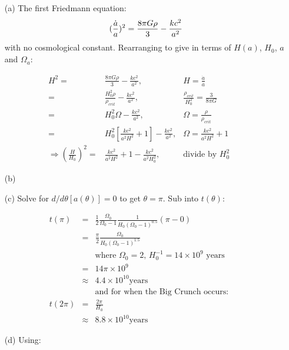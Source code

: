 \documentclass[10pt,a4paper]{article}
\begin{document}
\begin{itemize}
	\item[(a)] The first Friedmann equation:
	\begin{equation}
		(\frac{\dot a}{a})^{2} = \frac{8 \pi G \rho}{3} - \frac{kc^{2}}{a^{2}} \\
	\end{equation}
	with no cosmological constant. Rearranging to give in terms of $H(a)$, $H_{0}$, $a$ and $\Omega_{a}$:
\end{itemize}
\begin{eqnarray*}
	H^{2} =& \frac{8 \pi G \rho}{3} - \frac{kc^{2}}{a^{2}}, &H = \frac{\dot a}{a} \\
	  =& \frac{H_{0}^{2} \rho}{\rho_{crit}} - \frac{kc^{2}}{a^{2}}, &\frac{\rho_{crit}}{H_{0}^{2}} = \frac{3}{8 \pi G} \\
	  =& H_{0}^{2}\Omega - \frac{kc^{2}}{a^{2}}, &\Omega = \frac{\rho}{\rho_{crit}} \\
	  =& H_{0}^{2}[\frac{kc^{2}}{a^{2}H^{2}} + 1] - \frac{kc^{2}}{a^{2}}, & \Omega = \frac{kc^{2}}{a^{2}H^{2}} + 1 \\
	\Rightarrow (\frac{H}{H_{0}})^{2} =& \frac{kc^{2}}{a^{2}H^{2}} + 1 - \frac{kc^{2}}{a^{2}H_{0}^{2}}, &\mbox{divide by $H_{0}^{2}$}
\end{eqnarray*}
\begin{itemize}
	\item[(b)] 
	\item[(c)] Solve for $d/d\theta [a(\theta)] = 0$ to get $\theta = \pi$. Sub into $t(\theta)$:
\end{itemize}
\begin{eqnarray*}
	t(\pi) &=& \frac{1}{2}\frac{\Omega_{0}}{\Omega_{0} - 1} \frac{1}{H_{0}(\Omega_{0} - 1)^{0.5}} (\pi - 0) \\
	       &=& \frac{\pi}{2}\frac{\Omega_{0}}{H_{0}(\Omega_{0} - 1)^{1.5}} \\
		   &&\mbox{where $\Omega_{0} = 2$, $H_{0}^{-1} = 14 \times 10^{9}$ years} \\
		   &=& 14\pi \times 10^{9} \\
		   &\approx& 4.4 \times 10^{10} \mbox{years} \\
		   &&\mbox{and for when the Big Crunch occurs:} \\
	t(2\pi) &=& \frac{2\pi}{H_{0}} \\
		  &\approx& 8.8 \times 10^{10} \mbox{years}
\end{eqnarray*}
\begin{itemize}
	\item[(d)] Using:
\end{itemize}
\end{document}

